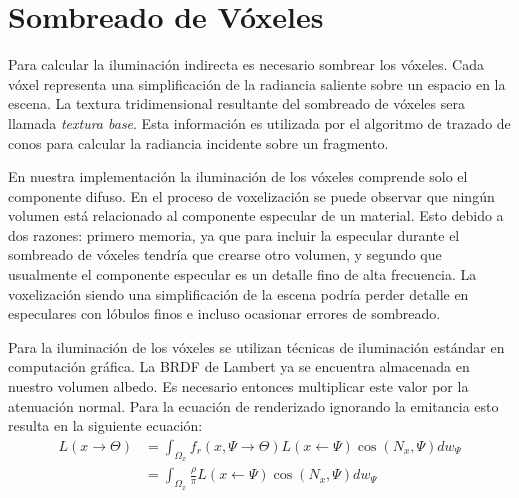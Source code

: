 \section{Sombreado de Vóxeles} %
\label{sec:sombreado_de_voxeles_impl}
Para calcular la iluminación indirecta es necesario sombrear los vóxeles. Cada vóxel representa una simplificación de la radiancia saliente sobre un espacio en la escena. La textura tridimensional resultante del sombreado de vóxeles sera llamada \emph{textura base}. Esta información es utilizada por el algoritmo de trazado de conos para calcular la radiancia incidente sobre un fragmento.

En nuestra implementación la iluminación de los vóxeles comprende solo el componente difuso. En el proceso de voxelización se puede observar que ningún volumen está relacionado al componente especular de un material. Esto debido a dos razones: primero memoria, ya que para incluir la especular durante el sombreado de vóxeles tendría que crearse otro volumen, y segundo que usualmente el componente especular es un detalle fino de alta frecuencia. La voxelización siendo una simplificación de la escena podría perder detalle en especulares con lóbulos finos e incluso ocasionar errores de sombreado.

Para la iluminación de los vóxeles se utilizan técnicas de iluminación estándar en computación gráfica. La \ac{BRDF} de Lambert ya se encuentra almacenada en nuestro volumen albedo. Es necesario entonces multiplicar este valor por la atenuación normal. Para la ecuación de renderizado ignorando la emitancia esto resulta en la siguiente ecuación:
\begin{equation}
	\begin{split}
		L(x\to\Theta) &= \int_{\Omega_{x}}{f_{r}(x, \Psi\to\Theta)L(x\gets\Psi)\cos(N_{x}, \Psi)dw_{\Psi}}\\
		&= \int_{\Omega_{x}}{\frac{\rho}{\pi}L(x\gets\Psi)\cos(N_{x}, \Psi)dw_{\Psi}}
	\end{split}
	\label{eq:shading_voxels}
\end{equation}


